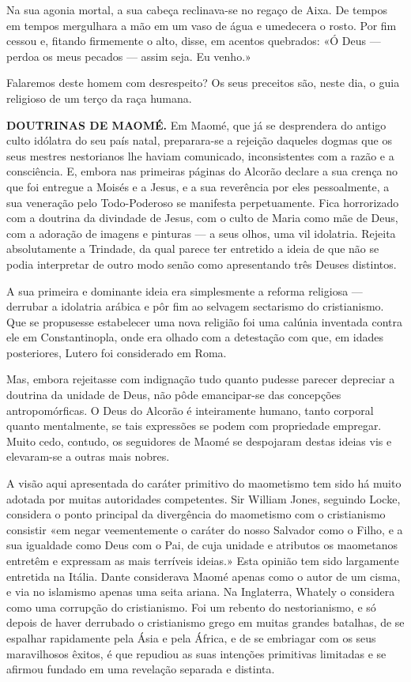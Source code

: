 \documentclass[11pt,a5paper,twoside,openany]{book}
\begin{document}
Na sua agonia mortal, a sua cabeça reclinava-se no regaço de Aixa. De tempos em tempos mergulhara a mão em um vaso de água e umedecera o rosto. Por fim cessou e, fitando firmemente o alto, disse, em acentos quebrados: «Ó Deus — perdoa os meus pecados — assim seja. Eu venho.»

Falaremos deste homem com desrespeito? Os seus preceitos são, neste dia, o guia religioso de um terço da raça humana.

\textbf{DOUTRINAS DE MAOMÉ.} Em Maomé, que já se desprendera do antigo culto idólatra do seu país natal, preparara-se a rejeição daqueles dogmas que os seus mestres nestorianos lhe haviam comunicado, inconsistentes com a razão e a consciência. E, embora nas primeiras páginas do Alcorão declare a sua crença no que foi entregue a Moisés e a Jesus, e a sua reverência por eles pessoalmente, a sua veneração pelo Todo-Poderoso se manifesta perpetuamente. Fica horrorizado com a doutrina da divindade de Jesus, com o culto de Maria como mãe de Deus, com a adoração de imagens e pinturas — a seus olhos, uma vil idolatria. Rejeita absolutamente a Trindade, da qual parece ter entretido a ideia de que não se podia interpretar de outro modo senão como apresentando três Deuses distintos.

A sua primeira e dominante ideia era simplesmente a reforma religiosa — derrubar a idolatria arábica e pôr fim ao selvagem sectarismo do cristianismo. Que se propusesse estabelecer uma nova religião foi uma calúnia inventada contra ele em Constantinopla, onde era olhado com a detestação com que, em idades posteriores, Lutero foi considerado em Roma.

Mas, embora rejeitasse com indignação tudo quanto pudesse parecer depreciar a doutrina da unidade de Deus, não pôde emancipar-se das concepções antropomórficas. O Deus do Alcorão é inteiramente humano, tanto corporal quanto mentalmente, se tais expressões se podem com propriedade empregar. Muito cedo, contudo, os seguidores de Maomé se despojaram destas ideias vis e elevaram-se a outras mais nobres.

A visão aqui apresentada do caráter primitivo do maometismo tem sido há muito adotada por muitas autoridades competentes. Sir William Jones, seguindo Locke, considera o ponto principal da divergência do maometismo com o cristianismo consistir «em negar veementemente o caráter do nosso Salvador como o Filho, e a sua igualdade como Deus com o Pai, de cuja unidade e atributos os maometanos entretêm e expressam as mais terríveis ideias.» Esta opinião tem sido largamente entretida na Itália. Dante considerava Maomé apenas como o autor de um cisma, e via no islamismo apenas uma seita ariana. Na Inglaterra, Whately o considera como uma corrupção do cristianismo. Foi um rebento do nestorianismo, e só depois de haver derrubado o cristianismo grego em muitas grandes batalhas, de se espalhar rapidamente pela Ásia e pela África, e de se embriagar com os seus maravilhosos êxitos, é que repudiou as suas intenções primitivas limitadas e se afirmou fundado em uma revelação separada e distinta.
\end{document}
